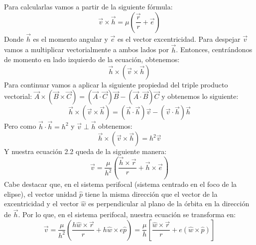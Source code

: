 \documentclass{article}
\numberwithin{equation}{section}
\begin{document}
Para calcularlas vamos a partir de la siguiente 
fórmula: 
\begin{equation}
    \overrightarrow{v}\times \overrightarrow{h}=\mu\left(\frac{\overrightarrow{r}}{r}+\overrightarrow{e}\right) 
\end{equation}
Donde $\overrightarrow{h}$ es el momento angular y 
$\overrightarrow{e}$ es el vector excentricidad. Para despejar 
$\overrightarrow{v}$ vamos a multiplicar vectorialmente a ambos 
lados por $\overrightarrow{h}$. Entonces, centrándonos de momento 
en lado izquierdo de la ecuación, obtenemos: 
\begin{equation*}
    \overrightarrow{h}\times(\overrightarrow{v}\times\overrightarrow{h})
\end{equation*}
Para continuar vamos a aplicar la siguiente propiedad del 
triple producto vectorial: $\overrightarrow{A}\times(\overrightarrow{B}\times\overrightarrow{C})
=(\overrightarrow{A}\cdot\overrightarrow{C})\overrightarrow{B}-(\overrightarrow{A}\cdot\overrightarrow{B})\overrightarrow{C}$
y obtenemos lo siguiente: 
\begin{equation*}
    \overrightarrow{h}\times(\overrightarrow{v}\times\overrightarrow{h})=(\overrightarrow{h}\cdot\overrightarrow{h})\overrightarrow{v}-(\overrightarrow{v}\cdot\overrightarrow{h})\overrightarrow{h}
\end{equation*}
Pero como $\overrightarrow{h}\cdot\overrightarrow{h}=h^{2}$ y 
$\overrightarrow{v}\perp\overrightarrow{h}$ obtenemos: 
\begin{equation*}
    \overrightarrow{h}\times(\overrightarrow{v}\times\overrightarrow{h})=h^{2}\overrightarrow{v}
\end{equation*}
Y nuestra ecuación 2.2 queda de la siguiente manera:
\begin{equation}
    \overrightarrow{v}=\frac{\mu}{h^{2}}\left(\frac{\overrightarrow{h}\times\overrightarrow{r}}{r}+\overrightarrow{h}\times\overrightarrow{e}\right)
\end{equation}
Cabe destacar que, en el sistema perifocal (sistema centrado en el foco de la elipse), el vector unidad 
$\hat{p}$ tiene la misma dirección que el vector 
de la excentricidad y el vector $\hat{w}$ es perpendicular 
al plano de la órbita en la dirección de $\overrightarrow{h}$. Por 
lo que, en el sistema perifocal, nuestra ecuación se transforma en: 
\begin{equation}
    \overrightarrow{v}=\frac{\mu}{h^{2}}\left(\frac{h\hat{w}\times\overrightarrow{r}}{r}+h\hat{w}\times e\hat{p}\right)=\frac{\mu}{h}\left[\frac{\hat{w}\times\overrightarrow{r}}{r}+e(\hat{w}\times\hat{p})\right]
\end{equation}
\end{document}

